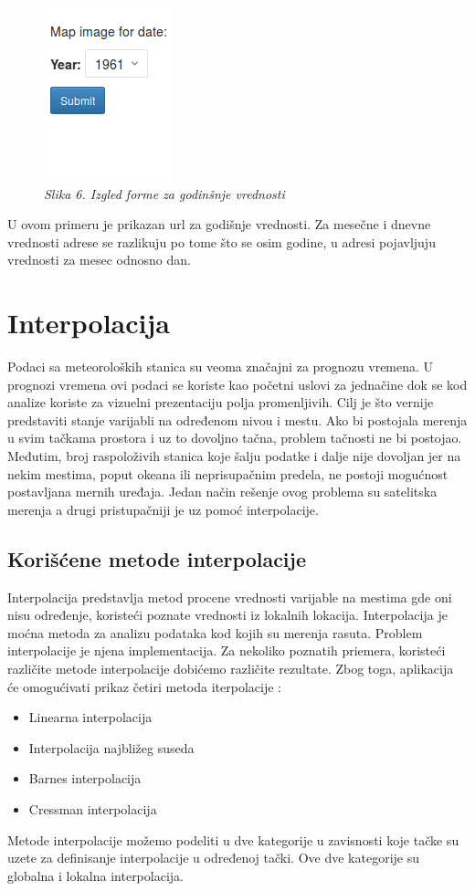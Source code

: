 \documentclass[12pt]{article}
\begin{document}
\begin{figure}[h!]
	\centering
	\includegraphics[width=0.25\linewidth]{Yearly.png}
	\caption*{\textsl{Slika 6. Izgled forme za godinšnje vrednosti}}
\end{figure}
U ovom primeru je prikazan url za godišnje vrednosti. Za mesečne i dnevne vrednosti adrese se razlikuju po tome što se osim godine, u adresi pojavljuju vrednosti za mesec odnosno dan.

\newpage
\section{Interpolacija}

Podaci sa meteoroloških stanica su veoma značajni za prognozu vremena. U prognozi vremena ovi podaci se koriste kao početni uslovi za jednačine dok se kod analize koriste za vizuelni prezentaciju polja promenljivih. Cilj je što vernije predstaviti stanje varijabli na određenom nivou i mestu. Ako bi postojala merenja u svim tačkama prostora i uz to dovoljno tačna, problem tačnosti ne bi postojao. Međutim, broj raspoloživih stanica koje šalju podatke i dalje nije dovoljan jer na nekim mestima, poput okeana ili neprisupačnim predela, ne postoji mogućnost postavljana mernih uređaja. Jedan način rešenje ovog problema su satelitska merenja a drugi pristupačniji je uz pomoć interpolacije.
\subsection{Korišćene metode interpolacije}
Interpolacija predstavlja metod procene vrednosti varijable na mestima gde oni nisu određenje, koristeći poznate vrednosti iz lokalnih lokacija. Interpolacija je moćna metoda za analizu podataka kod kojih su merenja rasuta. Problem interpolacije je njena implementacija. Za nekoliko poznatih priemera, koristeći različite metode interpolacije dobićemo različite rezultate. Zbog toga, aplikacija će omogućivati prikaz četiri metoda iterpolacije :
\begin{itemize}
\item Linearna interpolacija
\item Interpolacija najbližeg suseda
\item Barnes interpolacija
\item Cressman interpolacija
\end{itemize}
Metode interpolacije možemo podeliti u dve kategorije u zavisnosti koje tačke su uzete za definisanje interpolacije u određenoj tački. Ove dve kategorije su globalna i lokalna interpolacija.
\end{document}

